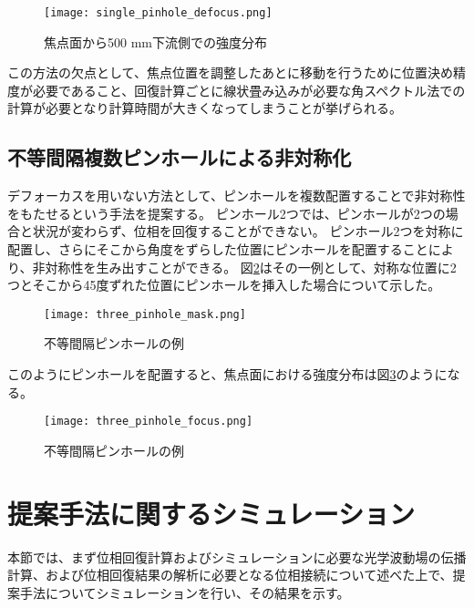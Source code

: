 \begin{figure}[!ht]
\centering
\texttt{[image: single\_pinhole\_defocus.png]}
\caption{焦点面から500 mm下流側での強度分布}
\label{fig:single_pinhole_defocus}
\end{figure}

この方法の欠点として、焦点位置を調整したあとに移動を行うために位置決め精度が必要であること、回復計算ごとに線状畳み込みが必要な角スペクトル法での計算が必要となり計算時間が大きくなってしまうことが挙げられる。

\subsection{不等間隔複数ピンホールによる非対称化}
デフォーカスを用いない方法として、ピンホールを複数配置することで非対称性をもたせるという手法を提案する。
ピンホール2つでは、ピンホールが2つの場合と状況が変わらず、位相を回復することができない。
ピンホール2つを対称に配置し、さらにそこから角度をずらした位置にピンホールを配置することにより、非対称性を生み出すことができる。
図\ref{fig:three_pinhole_mask}はその一例として、対称な位置に2つとそこから45度ずれた位置にピンホールを挿入した場合について示した。

\begin{figure}[!ht]
\centering
\texttt{[image: three\_pinhole\_mask.png]}
\caption{不等間隔ピンホールの例}
\label{fig:three_pinhole_mask}
\end{figure}

このようにピンホールを配置すると、焦点面における強度分布は図\ref{fig:three_pinhole_focus}のようになる。

\begin{figure}[!ht]
\centering
\texttt{[image: three\_pinhole\_focus.png]}
\caption{不等間隔ピンホールの例}
\label{fig:three_pinhole_focus}
\end{figure}


\clearpage
\newpage

\section{提案手法に関するシミュレーション}
\label{chap3_transverse_simulation}

本節では、まず位相回復計算およびシミュレーションに必要な光学波動場の伝播計算、および位相回復結果の解析に必要となる位相接続について述べた上で、提案手法についてシミュレーションを行い、その結果を示す。

